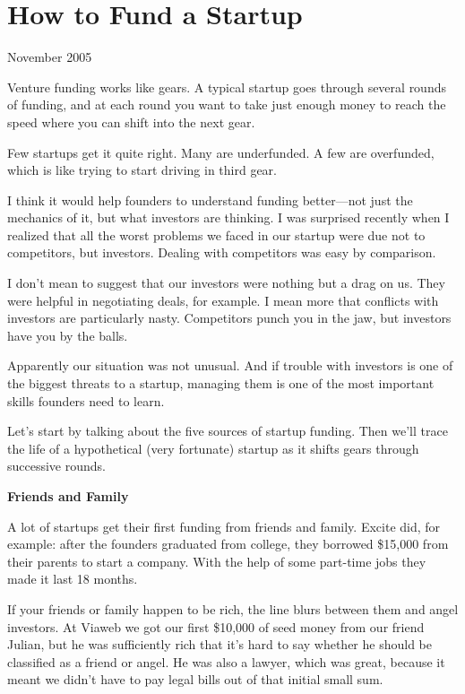 \chapter{How to Fund a Startup}





November 2005


Venture funding works like gears.  A typical startup goes through
several rounds of funding, and at each round you want to take just
enough money to reach the speed where you can shift into the next
gear.

Few startups get it quite right.  Many are underfunded.  A few are
overfunded, which is like trying to start driving in third gear.

I think it would help founders to understand funding better---not
just the mechanics of it, but what investors are thinking.  I was
surprised recently when I realized that all the worst problems we
faced in our startup were due not to competitors, but investors.
Dealing with competitors was easy by comparison.

I don't mean to suggest that our investors were nothing but a drag
on us.  They were helpful in negotiating deals, for example.  I
mean more that conflicts with investors are particularly nasty.
Competitors punch you in the jaw, but investors have you by the
balls.

Apparently our situation was not unusual.  And if trouble with
investors is one of the biggest threats to a startup, managing them
is one of the most important skills founders need to learn.

Let's start by talking about the five sources of startup funding.
Then we'll trace the life of a hypothetical (very fortunate) startup
as it shifts gears through successive rounds.

\textbf{Friends and Family}

A lot of startups get their first funding from friends and family.
Excite did, for example: after the founders graduated from college,
they borrowed \$15,000 from their parents to start a company.  With
the help of some part-time jobs they made it last 18 months.

If your friends or family happen to be rich, the line blurs between
them and angel investors.  At Viaweb we got our first \$10,000 of
seed money from our friend Julian, but he was sufficiently rich
that it's hard to say whether he should be classified as a friend
or angel.  He was also a lawyer, which was great, because it meant
we didn't have to pay legal bills out of that initial small sum.

